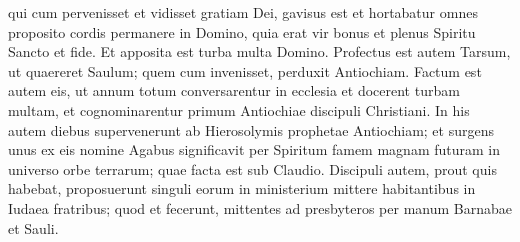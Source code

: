 \begin{biblechapter}
\verse qui cum pervenisset et vidisset gratiam Dei, gavisus est et hortabatur omnes proposito cordis permanere in Domino, 
\verse quia erat vir bonus et plenus Spiritu Sancto et fide. Et apposita est turba multa Domino. 
\verse Profectus est autem Tarsum, ut quaereret Saulum; 
\verse quem cum invenisset, perduxit Antiochiam. Factum est autem eis, ut annum totum conversarentur in ecclesia et docerent turbam multam, et cognominarentur primum Antiochiae discipuli Christiani. 
\verse In his autem diebus supervenerunt ab Hierosolymis prophetae Antiochiam;  
\verse et surgens unus ex eis nomine Agabus significavit per Spiritum famem magnam futuram in universo orbe terrarum; quae facta est sub Claudio. 
\verse Discipuli autem, prout quis habebat, proposuerunt singuli eorum in ministerium mittere habitantibus in Iudaea fratribus; 
\verse quod et fecerunt, mittentes ad presbyteros per manum Barnabae et Sauli. 
\end{biblechapter}

